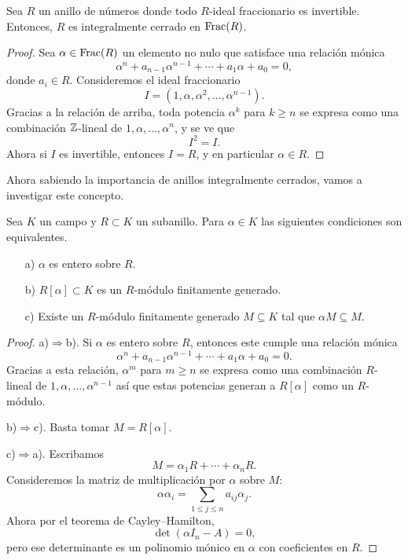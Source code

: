 \begin{proposicion}
  Sea $R$ un anillo de números donde todo $R$-ideal fraccionario es invertible.
  Entonces, $R$ es integralmente cerrado en $\operatorname{Frac} (R)$.

  \begin{proof}
    Sea $\alpha \in \operatorname{Frac} (R)$ un elemento no nulo que satisface una relación
    mónica
    $$\alpha^n + a_{n-1} \alpha^{n-1} + \cdots + a_1 \alpha + a_0 = 0,$$
    donde $a_i \in R$. Consideremos el ideal fraccionario
    $$I = (1,\alpha,\alpha^2,\ldots,\alpha^{n-1}).$$
    Gracias a la relación de arriba, toda potencia $\alpha^k$ para $k \ge n$
    se expresa como una combinación $\mathbb{Z}$-lineal de $1,\alpha,\ldots,\alpha^n$,
    y se ve que
    $$I^2 = I.$$
    Ahora si $I$ es invertible, entonces $I = R$, y en particular
    $\alpha \in R$.
  \end{proof}
\end{proposicion}

Ahora sabiendo la importancia de anillos integralmente cerrados, vamos
a investigar este concepto.

\begin{lema}
  \label{lema:caracterizacion-de-integralidad}
  Sea $K$ un campo y $R \subset K$ un subanillo.
  Para $\alpha \in K$ las siguientes condiciones son equivalentes.

  \begin{enumerate}
  \item[a)] $\alpha$ es entero sobre $R$.

  \item[b)] $R [\alpha] \subset K$ es un $R$-módulo finitamente generado.

  \item[c)] Existe un $R$-módulo finitamente generado $M \subseteq K$ tal que
    $\alpha M \subseteq M$.
  \end{enumerate}

  \begin{proof}
    \noindent a)$\Rightarrow$b).
    Si $\alpha$ es entero sobre $R$, entonces este cumple una relación mónica
    $$\alpha^n + a_{n-1} \alpha^{n-1} + \cdots + a_1 \alpha + a_0 = 0.$$
    Gracias a esta relación, $\alpha^m$ para $m \ge n$ se expresa como
    una combinación $R$-lineal de $1, \alpha, \ldots, \alpha^{n-1}$ así que
    estas potencias generan a $R [\alpha]$ como un $R$-módulo.

    \noindent b)$\Rightarrow$c).
    Basta tomar $M = R [\alpha]$.

    \noindent c)$\Rightarrow$a).
    Escribamos
    $$M = \alpha_1 R + \cdots + \alpha_n R.$$
    Consideremos la matriz de multiplicación por $\alpha$ sobre $M$:
    $$\alpha \alpha_i = \sum_{1 \le j \le n} a_{ij} \alpha_j.$$
    Ahora por el teorema de Cayley--Hamilton,
    $$\det (\alpha I_n - A) = 0,$$
    pero ese determinante es un polinomio mónico en $\alpha$ con coeficientes en
    $R$.
  \end{proof}
\end{lema}

